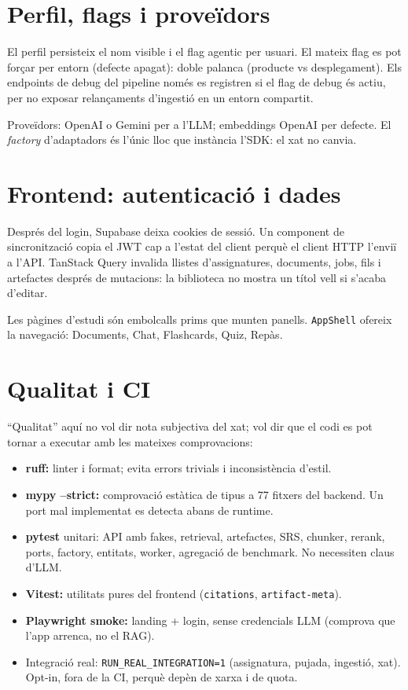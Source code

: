 \section{Perfil, flags i proveïdors}

El perfil persisteix el nom visible i el flag agentic per usuari. El mateix flag es pot forçar per entorn (defecte apagat): doble palanca (producte vs desplegament). Els endpoints de debug del pipeline només es registren si el flag de debug és actiu, per no exposar relançaments d'ingestió en un entorn compartit.

Proveïdors: OpenAI o Gemini per a l'LLM; embeddings OpenAI per defecte. El \emph{factory} d'adaptadors és l'únic lloc que instància l'SDK: el xat no canvia.

\section{Frontend: autenticació i dades}

Després del login, Supabase deixa cookies de sessió. Un component de sincronització copia el JWT cap a l'estat del client perquè el client HTTP l'enviï a l'API. TanStack Query invalida llistes d'assignatures, documents, jobs, fils i artefactes després de mutacions: la biblioteca no mostra un títol vell si s'acaba d'editar.

Les pàgines d'estudi són embolcalls prims que munten panells. \texttt{AppShell} ofereix la navegació: Documents, Chat, Flashcards, Quiz, Repàs.

\section{Qualitat i CI}

``Qualitat'' aquí no vol dir nota subjectiva del xat; vol dir que el codi es pot tornar a executar amb les mateixes comprovacions:

\begin{itemize}
  \item \textbf{ruff:} linter i format; evita errors trivials i inconsistència d'estil.
  \item \textbf{mypy --strict:} comprovació estàtica de tipus a 77 fitxers del backend. Un port mal implementat es detecta abans de runtime.
  \item \textbf{pytest} unitari: API amb fakes, retrieval, artefactes, SRS, chunker, rerank, ports, factory, entitats, worker, agregació de benchmark. No necessiten claus d'LLM.
  \item \textbf{Vitest:} utilitats pures del frontend (\texttt{citations}, \texttt{artifact-meta}).
  \item \textbf{Playwright smoke:} landing + login, sense credencials LLM (comprova que l'app arrenca, no el RAG).
  \item Integració real: \texttt{RUN\_REAL\_INTEGRATION=1} (assignatura, pujada, ingestió, xat). Opt-in, fora de la CI, perquè depèn de xarxa i de quota.
\end{itemize}

